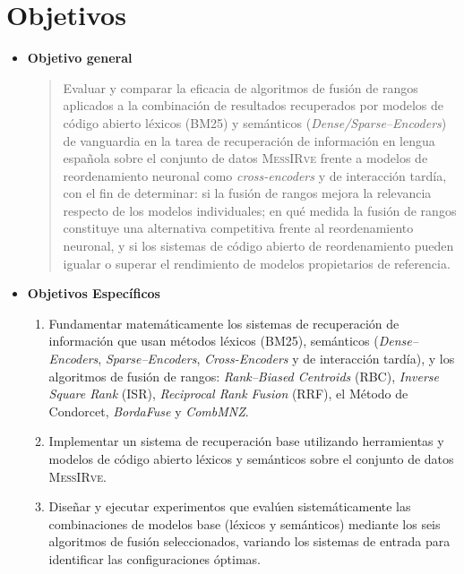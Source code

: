 \documentclass[12pt]{article}
\begin{document}
    \section{Objetivos}\label{sec:objetivos}
    \begin{itemize}
        \item \textbf{Objetivo general}
        \begin{quote}
        	Evaluar y comparar la eficacia de algoritmos de fusión de rangos aplicados a la combinación de resultados recuperados por modelos de código abierto léxicos (BM25) y semánticos (\textit{Dense/Sparse--Encoders}) de vanguardia en la tarea de recuperación de información en lengua española sobre el conjunto de datos \textsc{MessIRve} frente a modelos de reordenamiento neuronal como \textit{cross-encoders} y de interacción tardía, con el fin de determinar: si la fusión de rangos mejora la relevancia respecto de los modelos individuales; en qué medida la fusión de rangos constituye una alternativa competitiva frente al reordenamiento neuronal, y si los sistemas de código abierto de reordenamiento pueden igualar o superar el rendimiento de modelos propietarios de referencia.
        \end{quote}
        
        \item \textbf{Objetivos Específicos}
        \begin{enumerate}
            \item  Fundamentar matemáticamente los sistemas de recuperación de información que usan métodos léxicos (BM25), semánticos (\textit{Dense--Encoders}, \textit{Sparse--Encoders},  \textit{Cross-Encoders} y de interacción tardía), y los algoritmos de fusión de rangos: \textit{Rank--Biased Centroids} (RBC), \textit{Inverse Square Rank} (ISR), \textit{Reciprocal Rank Fusion} (RRF), el Método de Condorcet, \textit{BordaFuse} y \textit{CombMNZ}.
            
            \item Implementar un sistema de recuperación base utilizando herramientas y modelos de código abierto léxicos y semánticos sobre el conjunto de datos \textsc{MessIRve}.
            
            \item Diseñar y ejecutar experimentos que evalúen sistemáticamente las combinaciones de modelos base (léxicos y semánticos) mediante los seis algoritmos de fusión seleccionados, variando los sistemas de entrada para identificar las configuraciones óptimas.
            

\end{enumerate}
\end{itemize}
\end{document}
